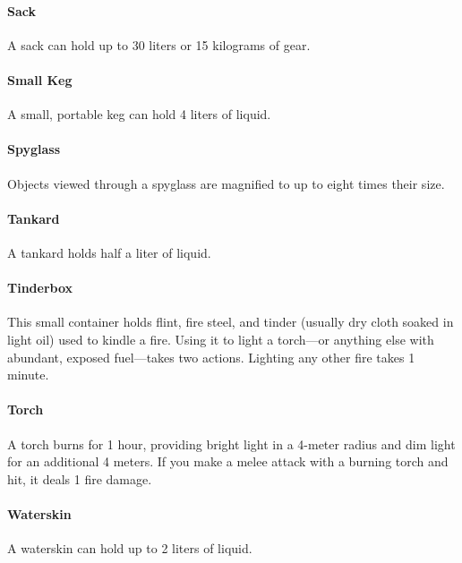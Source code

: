     \paragraph{Sack}
        A sack can hold up to 30 liters or 15 kilograms of gear.
    \paragraph{Small Keg}
        A small, portable keg can hold 4 liters of liquid.
    \paragraph{Spyglass}
        Objects viewed through a spyglass are magnified to up to eight times their size.
    \paragraph{Tankard}
        A tankard holds half a liter of liquid.
    \paragraph{Tinderbox}
        This small container holds flint, fire steel, and tinder (usually dry cloth soaked in light oil) used to kindle a fire.
        Using it to light a torch---or anything else with abundant, exposed fuel---takes two actions.
        Lighting any other fire takes 1 minute.
    \paragraph{Torch}
        A torch burns for 1 hour, providing bright light in a 4-meter radius and dim light for an additional 4 meters.
        If you make a melee attack with a burning torch and hit, it deals 1 fire damage.
    \paragraph{Waterskin}
        A waterskin can hold up to 2 liters of liquid.

